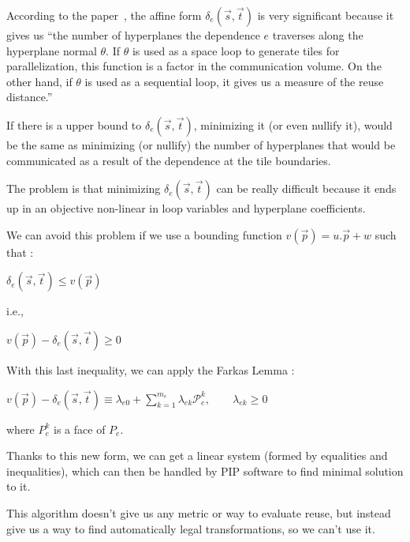 \documentclass[paper=a4, fontsize=11pt]{scrartcl}
\numberwithin{equation}{section}        %
\numberwithin{figure}{section}          %
\numberwithin{table}{section}               %
\begin{document}
            According to the paper~\cite{Bondhugula:2008:PAP:1379022.1375595},
            the affine form $\delta_e\left(\vec{s},\vec{t}\right)$ is very significant
            because it gives us ``the number of hyperplanes the dependence $e$ traverses
            along the hyperplane normal $\theta$. If $\theta$ is used as a space loop to generate tiles
            for parallelization, this function is a factor in the communication
            volume. On the other hand, if $\theta$ is used as a sequential loop, it
            gives us a measure of the reuse distance.''

            If there is a upper bound to $\delta_e\left(\vec{s},\vec{t}\right)$,
            minimizing it (or even nullify it), would be the same as minimizing (or nullify)
            the number of hyperplanes that would be communicated as a result of
            the dependence at the tile boundaries.

            The problem is that minimizing $\delta_e\left(\vec{s},\vec{t}\right)$
            can be really difficult because it ends up in an objective non-linear
            in loop variables and hyperplane coefficients.

            We can avoid this problem if we use a bounding function $v(\vec{p}) = u.\vec{p} + w$ such that :
            \begin{center}
                $\delta_e\left(\vec{s},\vec{t}\right) \leq v(\vec{p})$
            \end{center}
            i.e.,
            \begin{center}
                $v(\vec{p}) - \delta_e\left(\vec{s},\vec{t}\right) \geq 0$
            \end{center}

            With this last inequality, we can apply the Farkas Lemma :
            \begin{center}
                $v(\vec{p}) - \delta_e\left(\vec{s},\vec{t}\right) \equiv \lambda_{e0}
                + \sum\limits_{k=1}^{m_e}{\lambda_{ek}\mathcal{P}_{e}^k},\qquad \lambda_{ek} \geq 0$
            \end{center}
            where $P_e^k$ is a face of $P_e$.

            Thanks to this new form, we can get a linear system (formed by equalities and
            inequalities), which can then be handled by PIP software to find
            minimal solution to it.

            This algorithm doesn't give us any metric or way to evaluate reuse, but instead
            give us a way to find automatically legal transformations, so we can't use it.
\end{document}
